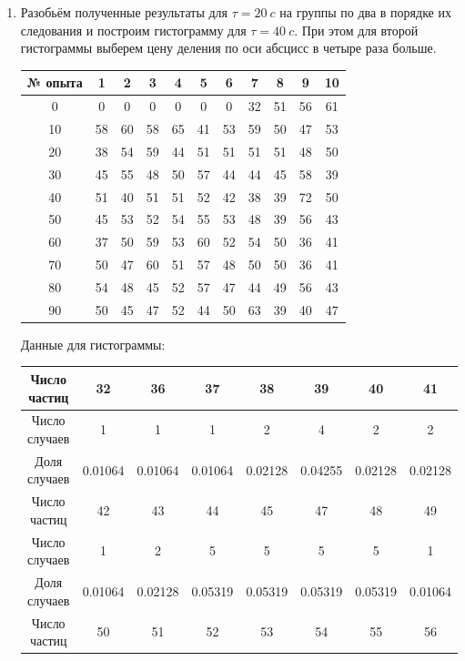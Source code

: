 \documentclass[a4paper, 12pt]{article}
\begin{document}
\begin{enumerate}
		\item Разобьём полученные результаты для $\tau = 20 \: c$ на группы по два в порядке их следования и построим гистограмму для $\tau = 40 \: c$. При этом для второй гистограммы выберем цену деления по оси абсцисс в четыре раза больше.
		\begin{center}
			\begin{tabular}{|c|c|c|c|c|c|c|c|c|c|c|}
				\hline
				№ опыта & 1 & 2 & 3 & 4 & 5 & 6 & 7 & 8 & 9 & 10\\ \hline
				0 & 0 & 0 & 0 & 0 & 0 & 0 & 32 & 51 & 56 & 61\\ \hline 
				10 & 58 & 60 & 58 & 65 & 41 & 53 & 59 & 50 & 47 & 53\\ \hline 
				20 & 38 & 54 & 59 & 44 & 51 & 51 & 51 & 51 & 48 & 50\\ \hline 
				30 & 45 & 55 & 48 & 50 & 57 & 44 & 44 & 45 & 58 & 39\\ \hline 
				40 & 51 & 40 & 51 & 51 & 52 & 42 & 38 & 39 & 72 & 50\\ \hline 
				50 & 45 & 53 & 52 & 54 & 55 & 53 & 48 & 39 & 56 & 43\\ \hline 
				60 & 37 & 50 & 59 & 53 & 60 & 52 & 54 & 50 & 36 & 41\\ \hline 
				70 & 50 & 47 & 60 & 51 & 57 & 48 & 50 & 50 & 36 & 41\\ \hline 
				80 & 54 & 48 & 45 & 52 & 57 & 47 & 44 & 49 & 56 & 43\\ \hline 
				90 & 50 & 45 & 47 & 52 & 44 & 50 & 63 & 39 & 40 & 47\\ \hline 
			\end{tabular}
		\end{center}
		Данные для гистограммы:
		\begin{center}
			\begin{tabular}{|c|c|c|c|c|c|c|c|}
				\hline
				Число частиц & 32 & 36 & 37 & 38 & 39 & 40 & 41\\
				\hline
				Число случаев & 1 & 1 & 1 & 2 & 4 & 2 & 2\\
				\hline
				Доля случаев & 0.01064 & 0.01064 & 0.01064 & 0.02128 & 0.04255 & 0.02128 & 0.02128\\
				\hline \cline{1-8}
				Число частиц & 42 & 43 & 44  & 45 & 47 & 48 & 49\\
				\hline
				Число случаев & 1 & 2 & 5 & 5 & 5 & 5 & 1\\
				\hline
				Доля случаев & 0.01064 & 0.02128 & 0.05319  & 0.05319 & 0.05319 & 0.05319 & 0.01064\\
				\hline \cline{1-8}
				Число частиц & 50 & 51 & 52 & 53 & 54 & 55 & 56\\

\end{tabular}
\end{center}
\end{enumerate}
\end{document}
